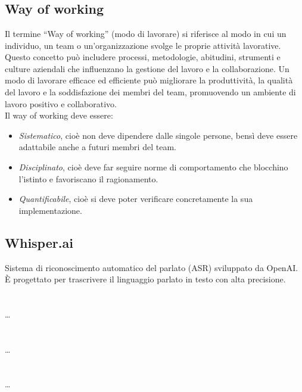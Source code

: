 
\section{}

\hypertarget{sec:way_of_working}{}
\subsection*{Way of working}
Il termine “Way of working” (modo di lavorare) si riferisce al modo in cui un individuo, un team o un’organizzazione svolge le proprie attività lavorative. 
Questo concetto può includere processi, metodologie, abitudini, strumenti e culture aziendali che influenzano la gestione del lavoro e la collaborazione. 
Un modo di lavorare efficace ed efficiente può migliorare la produttività, la qualità del lavoro e la soddisfazione dei membri del team, promuovendo un 
ambiente di lavoro positivo e collaborativo. \\
Il way of working deve essere:
\begin{itemize}
    \item \emph{Sistematico}, cioè non deve dipendere dalle singole persone, bensì deve essere adattabile anche a futuri membri del team.
    \item \emph{Disciplinato}, cioè deve far seguire norme di comportamento che blocchino l'istinto e favoriscano il ragionamento.
    \item \emph{Quantificabile}, cioè si deve poter verificare concretamente la sua implementazione.
\end{itemize}

\hypertarget{sec:whisper.ai}{}
\subsection*{Whisper.ai}
Sistema di riconoscimento automatico del parlato (ASR) sviluppato da OpenAI.
È progettato per trascrivere il linguaggio parlato in testo con alta precisione.

\newpage



\section{}

\dots

\newpage



\section{}

\dots

\newpage



\section{}

\dots
